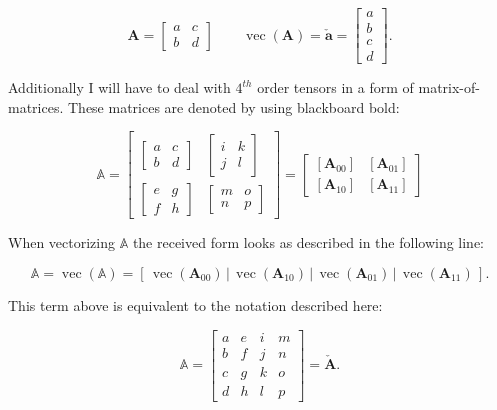\[
\textbf{A} = \begin{bmatrix} a & c \\ b & d \end{bmatrix} \qquad \operatorname{vec}(\textbf{A}) = \mathbf{\check{a}} = \begin{bmatrix} a \\ b \\ c \\ d \end{bmatrix}.
\]

Additionally I will have to deal with $4^{th}$ order tensors in a form of matrix-of-matrices. These matrices are denoted by using blackboard bold:

\[
\mathbb{A} = 
\left[\begin{array}{cc}{\begin{bmatrix} a & c \\ b & d \end{bmatrix}} & {\begin{bmatrix} i & k \\ j & l \end{bmatrix}} \\ {\begin{bmatrix} e & g \\ f & h \end{bmatrix}} & {\begin{bmatrix} m & o \\ n & p \end{bmatrix}}\end{array}\right]
=
\left[\begin{array}{cc}{\left[\mathbf{A}_{00}\right]} & {\left[\mathbf{A}_{01}\right]} \\ {\left[\mathbf{A}_{10}\right]} & {\left[\mathbf{A}_{11}\right]}\end{array}\right]
\]

When vectorizing $\mathbb{A}$ the received form looks as described in the following line:

\[
\mathbb{A} = \operatorname{vec}(\mathbb{A})= \left[ \,\operatorname{vec}\left(\mathbf{A}_{00}\right)\, \bigg| \,\operatorname{vec}\left(\mathbf{A}_{10}\right)\, \bigg| \,\operatorname{vec}\left(\mathbf{A}_{01}\right)\, \bigg| \,\operatorname{vec}\left(\mathbf{A}_{11}\right)\, \right].
\]

This term above is equivalent to the notation described here:

\[
\mathbb{A}=\left[\begin{array}{llll}{a} & {e} & {i} & {m} \\ {b} & {f} & {j} & {n} \\ {c} & {g} & {k} & {o} \\ {d} & {h} & {l} & {p}\end{array}\right] 
=\mathbf{\check{A}}.
\]

